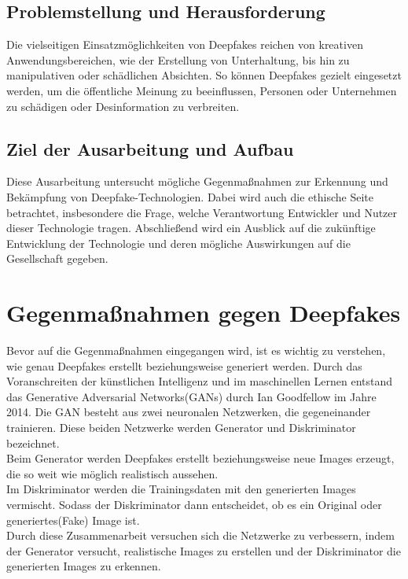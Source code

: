 \documentclass[a4paper,12pt]{article}
\begin{document}
\subsection{Problemstellung und Herausforderung}
Die vielseitigen Einsatzmöglichkeiten von Deepfakes reichen von kreativen Anwendungsbereichen, 
wie der Erstellung von Unterhaltung, bis hin zu manipulativen oder schädlichen Absichten. 
So können Deepfakes gezielt eingesetzt werden, um die öffentliche Meinung zu beeinflussen, 
Personen oder Unternehmen zu schädigen oder Desinformation zu verbreiten. \cite{CounterExtremism2020}\\

\subsection{Ziel der Ausarbeitung und Aufbau}
Diese Ausarbeitung untersucht mögliche Gegenmaßnahmen zur Erkennung und Bekämpfung von Deepfake-Technologien. 
Dabei wird auch die ethische Seite betrachtet, 
insbesondere die Frage, welche Verantwortung Entwickler und Nutzer dieser Technologie tragen. 
Abschließend wird ein Ausblick auf die zukünftige Entwicklung der Technologie und deren mögliche Auswirkungen auf die Gesellschaft gegeben.
\newpage

\section{Gegenmaßnahmen gegen Deepfakes}
Bevor auf die Gegenmaßnahmen eingegangen wird,
ist es wichtig zu verstehen, wie genau Deepfakes erstellt beziehungsweise generiert werden.
Durch das Voranschreiten der künstlichen Intelligenz und im maschinellen Lernen entstand
das Generative Adversarial Networks(GANs) durch Ian Goodfellow im Jahre 2014.
Die GAN besteht aus zwei neuronalen Netzwerken, die gegeneinander trainieren.
Diese beiden Netzwerke werden Generator und Diskriminator bezeichnet.\\
Beim Generator werden Deepfakes erstellt beziehungsweise neue Images erzeugt,
die so weit wie möglich realistisch aussehen.\\ 
Im Diskriminator werden die Trainingsdaten mit den generierten Images vermischt.
Sodass der Diskriminator dann entscheidet, ob es ein Original oder generiertes(Fake) Image ist.\\
Durch diese Zusammenarbeit versuchen sich die Netzwerke zu verbessern, indem der Generator versucht, realistische Images zu erstellen und der Diskriminator die 
generierten Images zu erkennen.\cite{BVDW2024}
\end{document}
